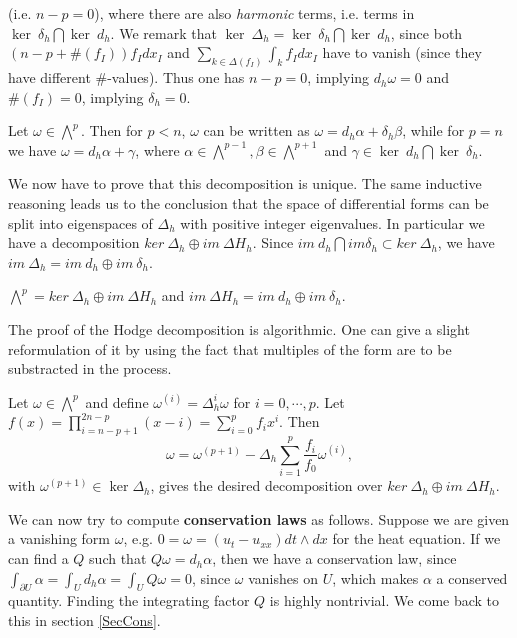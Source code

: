 (i.e. \(  n-p = 0 \)), where there are also
{\em harmonic} terms, i.e. terms in \( \ker \ \delta_h \bigcap \ker \ d_h \).
We remark that \( \ker \ \Delta_h =  \ker \ \delta_h \bigcap \ker \ d_h \),
since both \( ( n-p + \#(f_I) )  f_I dx_I \) and
\(  \sum_{k \in \Delta(f_I) } \int_k f_I dx_{I} \) have
to vanish (since they have different \( \# \)-values).
Thus one has \( n-p =0 \), implying \( d_h \omega = 0 \)
and \(\#(f_I) =0 \), implying \(\delta_h=0\).
\begin{Theorem}\label{Theorem1}
Let \( \omega \in \bigwedge^p\). Then for \( p<n\), \( \omega\)
can be written as \( \omega = d_h \alpha + \delta_h \beta \),
while for \( p=n \) we have \( \omega  = d_h \alpha + \gamma \),
where \( \alpha \in \bigwedge^{p-1} , \beta \in \bigwedge^{p+1} \)
and \( \gamma \in \ker \ d_h \bigcap \ker \ \delta_h \).
\end{Theorem}
We now have to prove that this decomposition is unique.
The same inductive reasoning leads us to the conclusion
that the space of differential forms can be split into eigenspaces of
\(\Delta_h\) with positive integer eigenvalues.
In particular we have a decomposition \( ker \ \Delta_h \oplus im \ \Delta H_h \).
Since \( im \ d_h \bigcap im \delta_h \subset ker \ \Delta_h \),
we have \( im \ \Delta_h = im \ d_h \oplus im \ \delta_h \).
\begin{Theorem}\label{Theorem01}
\( \bigwedge^p =ker \ \Delta_h \oplus im \ \Delta H_h \)
and \(  im \ \Delta H_h =  im \ d_h \oplus im \ \delta_h \).
\end{Theorem}
The proof of the Hodge decomposition is algorithmic.
One can give a slight reformulation of it by using the fact that 
multiples of the form are to be substracted in the process.
\begin{Algorithm}\label{Alg2}
Let \(\omega \in \bigwedge^p\) and define
\(\omega^{(i)}=\Delta_h^{i} \omega \) for \(i=0, \cdots , p\).
Let \( f(x)=\prod_{i=n-p+1}^{2n-p} (x-i) = \sum_{i=0}^{p} f_i x^i \).
Then
\[
\omega= \omega^{(p+1)} - \Delta_h \sum_{i=1}^{p}  \frac{f_i}{f_0} \omega^{(i)} ,
\]
with \(\omega^{(p+1)} \in \ker \Delta_h\), gives the desired decomposition
over \( ker \ \Delta_h \oplus im \ \Delta H_h\).
\end{Algorithm}
We can now try to compute {\bf conservation laws} as follows.
Suppose we are given a vanishing form \(\omega\), e.g. \( 0 = \omega = (u_t -u_{xx} ) dt \wedge dx \) for the heat equation.
If we can find a \(Q\) such that \( Q \omega = d_h \alpha \),
then we have a conservation law, since \( \int_{\partial U} \alpha =
\int_{U} d_h \alpha = \int_{U} Q \omega = 0 \), since \(\omega \) vanishes
on \(U\), which makes \(\alpha\) a conserved quantity.
Finding the integrating factor \(Q\) is highly nontrivial. We come back to this in section \ref{SecCons}.
